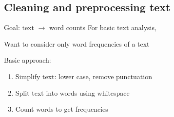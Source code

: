 \documentclass[aspectratio=169,usenames,dvipsnames]{beamer}
\begin{document}
\subsection{Cleaning and preprocessing text}
\begin{frame}{Goal: text $\rightarrow$ word counts}
    For basic text analysis,

    Want to consider only word frequencies of a text

    \vspace{1em}
    Basic approach:
    \begin{enumerate}
        \item Simplify text: lower case, remove punctuation
        \item Split text into words using whitespace
        \item Count words to get frequencies
    \end{enumerate}
\end{frame}
\end{document}
